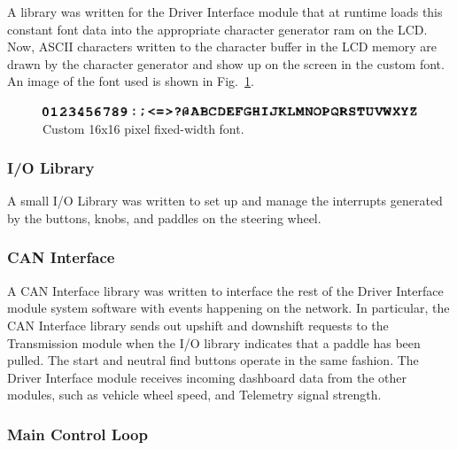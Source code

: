 A library was written for the Driver Interface module that at runtime loads this constant font data into the appropriate character generator ram on the LCD. Now, ASCII characters written to the character buffer in the LCD memory are drawn by the character generator and show up on the screen in the custom font. An image of the font used is shown in Fig.\ \ref{fig:driver_interface_font}.

\begin{figure}[htp]
 \centering
 \includegraphics[scale=1]{implementation/figures/driver_interface_font.eps}
 \caption{Custom 16x16 pixel fixed-width font.}
 \label{fig:driver_interface_font}
\end{figure}

\subsubsection{I/O Library}

A small I/O Library was written to set up and manage the interrupts generated by the buttons, knobs, and paddles on the steering wheel.
 
% 
% 
% 
% 


\subsubsection{CAN Interface}

A CAN Interface library was written to interface the rest of the Driver Interface module system software with events happening on the network. In particular, the CAN Interface library sends out upshift and downshift requests to the Transmission module when the I/O library indicates that a paddle has been pulled. The start and neutral find buttons operate in the same fashion. The Driver Interface module receives incoming dashboard data from the other modules, such as vehicle wheel speed, and Telemetry signal strength.

\subsubsection{Main Control Loop}